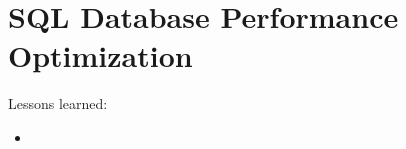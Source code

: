 \documentclass[a4paper,10pt]{article}
\begin{document}
\section{SQL Database Performance Optimization}
Lessons learned:
\begin{itemize}
 \item 
\end{itemize}
\end{document}
